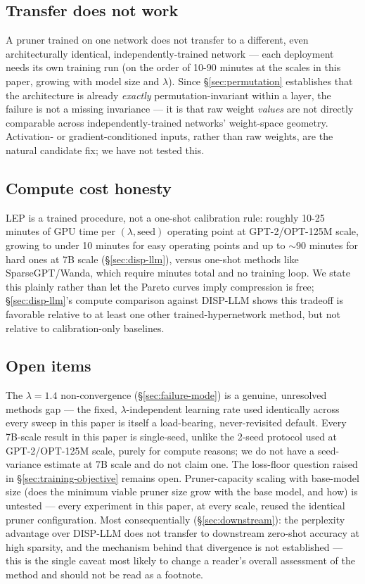 \documentclass[11pt]{article}
\begin{document}
\subsection{Transfer does not work}
\label{sec:transfer}

A pruner trained on one network does not transfer to a different, even
architecturally identical, independently-trained network --- each deployment
needs its own training run (on the order of 10-90 minutes at the scales in
this paper, growing with model size and $\lambda$). Since \S\ref{sec:permutation} establishes
that the architecture is already \emph{exactly} permutation-invariant within a
layer, the failure is not a missing invariance --- it is that raw weight
\emph{values} are not directly comparable across independently-trained networks'
weight-space geometry. Activation- or gradient-conditioned inputs, rather
than raw weights, are the natural candidate fix; we have not tested this.

\subsection{Compute cost honesty}

LEP is a trained procedure, not a one-shot calibration rule: roughly 10-25
minutes of GPU time per $(\lambda, \text{seed})$ operating point at
GPT-2/OPT-125M scale, growing to under 10 minutes for easy operating points
and up to $\sim$90 minutes for hard ones at 7B scale (\S\ref{sec:disp-llm}), versus one-shot
methods like SparseGPT/Wanda, which require minutes total and no training
loop. We state this plainly rather than let the Pareto curves imply
compression is free; \S\ref{sec:disp-llm}'s compute comparison against DISP-LLM shows this
tradeoff is favorable relative to at least one other trained-hypernetwork
method, but not relative to calibration-only baselines.

\subsection{Open items}
\label{sec:open-items}

The $\lambda=1.4$ non-convergence (\S\ref{sec:failure-mode}) is a genuine, unresolved methods
gap --- the fixed, $\lambda$-independent learning rate used identically across
every sweep in this paper is itself a load-bearing, never-revisited default.
Every 7B-scale result in this paper is single-seed, unlike the 2-seed
protocol used at GPT-2/OPT-125M scale, purely for compute reasons; we do not
have a seed-variance estimate at 7B scale and do not claim one. The
loss-floor question raised in \S\ref{sec:training-objective} remains open. Pruner-capacity scaling
with base-model size (does the minimum viable pruner size grow with the base
model, and how) is untested --- every experiment in this paper, at every
scale, reused the identical pruner configuration. Most consequentially
(\S\ref{sec:downstream}): the perplexity advantage over DISP-LLM does not transfer to
downstream zero-shot accuracy at high sparsity, and the mechanism behind
that divergence is not established --- this is the single caveat most likely
to change a reader's overall assessment of the method and should not be
read as a footnote.
\end{document}
